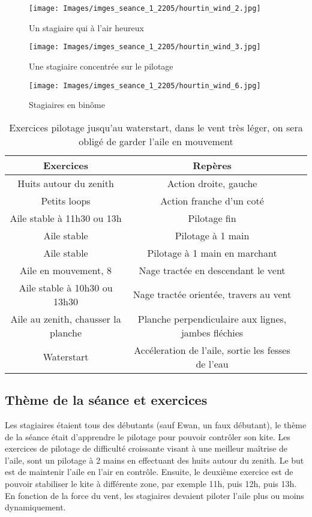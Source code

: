 \documentclass[11pt,a4paper]{report}
\begin{document}
\begin{figure}
\begin{minipage}{0.4\textwidth}
\texttt{[image: Images/imges\_seance\_1\_2205/hourtin\_wind\_2.jpg]} 
\caption{Un stagiaire qui à l'air heureux}
\end{minipage}
\hfill
\begin{minipage}{0.4\textwidth}
\texttt{[image: Images/imges\_seance\_1\_2205/hourtin\_wind\_3.jpg]} 
\caption{Une stagiaire concentrée sur le pilotage}
\end{minipage}
\end{figure}

\begin{figure}
\texttt{[image: Images/imges\_seance\_1\_2205/hourtin\_wind\_6.jpg]}
\caption{Stagiaires en bin\^ome} 
\end{figure}

\begin{table}
\begin{tabular}{|c|c|c|}
\hline
\textbf{Exercices}     &  \textbf{Repères}      \\
\hline 
Huits autour du zenith & Action droite, gauche   \\
\hline
Petits loops  & Action franche d'un coté  \\
\hline 
Aile stable à 11h30 ou 13h & Pilotage fin \\
\hline
Aile stable               & Pilotage à 1 main \\
\hline 
Aile stable               & Pilotage à 1 main en marchant \\
\hline
Aile en mouvement, 8      & Nage tractée en descendant le vent \\
\hline 
Aile stable à 10h30 ou 13h30   	& Nage tractée orientée, travers au vent \\
\hline
Aile au zenith, chausser la planche  & Planche perpendiculaire aux lignes, jambes fléchies \\
\hline
Waterstart                           &  Accéleration de l'aile, sortie les fesses de l'eau \\
\hline
\end{tabular}
\caption{Exercices pilotage jusqu'au waterstart, dans le vent très léger, on sera obligé de garder l'aile en mouvement\label{seance_pilotage}}
\end{table}

\subsection{Thème de la séance et exercices}
Les stagiaires étaient tous des débutants (sauf Ewan, un faux débutant), 
le thème de la séance était d'apprendre le pilotage pour pouvoir contrôler son kite.
Les exercices de pilotage de difficulté croissante visant à une
meilleur maîtrise de l'aile, sont un pilotage à 2 mains en effectuant des huits
autour du zenith. Le but est de maintenir l'aile en l'air en contrôle.
Ensuite, le deuxième exercice est de pouvoir stabiliser le kite à différente 
zone, par exemple 11h, puis 12h, puis 13h.
En fonction de la force du vent, les stagiaires
devaient piloter l'aile plus ou moins dynamiquement. 
\end{document}
